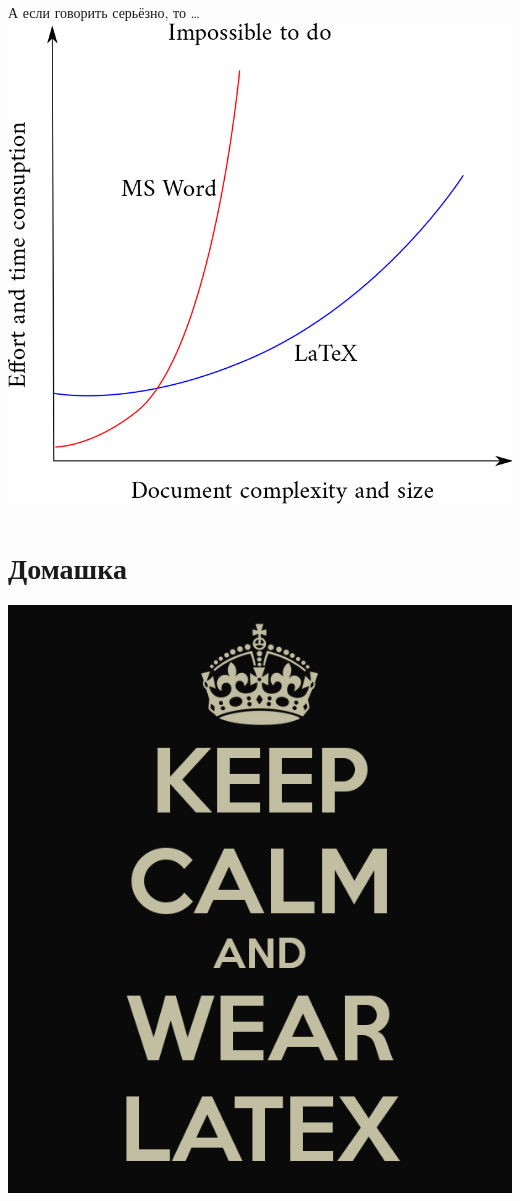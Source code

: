 \documentclass[newPxFont]{beamer}
\begin{document}
\begin{frame}{А если говорить серьёзно, то \ldots} 
    \centering
    \includegraphics[scale=0.2]{latexvsword.png}
\end{frame}


\section{Домашка} %


\begingroup
{}
\begin{frame}[plain]
\centering \includegraphics[width=0.7\linewidth]{keep-calm.png}
\end{frame}
\endgroup 
\end{document}
